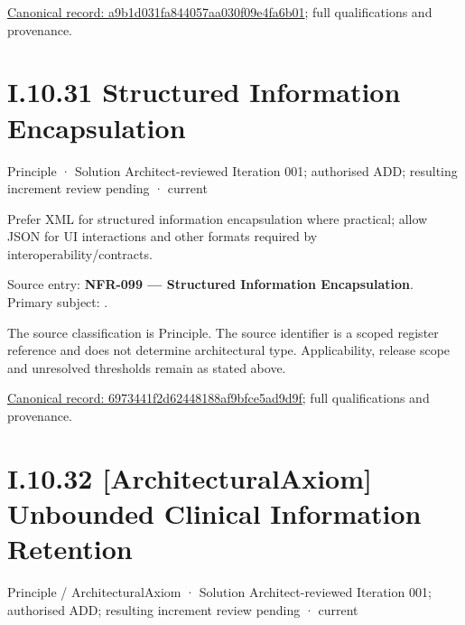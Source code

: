{\footnotesize \href{../../../../../../../continuum/motivation/principle/architectural-axiom/a9b1d031fa844057aa030f09e4fa6b01.md}{Canonical record: a9b1d031fa844057aa030f09e4fa6b01}; full qualifications and provenance.}\par
\section*{I.10.31 Structured Information Encapsulation}
\label{navigation:I.10.31}

\label{element:6973441f2d62448188af9bfce5ad9d9f}
{\small Principle · Solution Architect-reviewed Iteration 001; authorised ADD; resulting increment review pending · current}\par

Prefer XML for structured information encapsulation where practical; allow JSON for UI interactions and other formats required by interoperability/contracts.



Source entry: \textbf{NFR-099 — Structured Information Encapsulation}. Primary subject: \texttt{}.



The source classification is Principle. The source identifier is a scoped register reference and does not determine architectural type. Applicability, release scope and unresolved thresholds remain as stated above.


{\footnotesize \href{../../../../../../../continuum/motivation/principle/6973441f2d62448188af9bfce5ad9d9f.md}{Canonical record: 6973441f2d62448188af9bfce5ad9d9f}; full qualifications and provenance.}\par
\section*{I.10.32 [ArchitecturalAxiom] Unbounded Clinical Information Retention}
\label{navigation:I.10.32}

\label{element:4c270732fecf4e79bb83c938861ce05b}
{\small Principle / ArchitecturalAxiom · Solution Architect-reviewed Iteration 001; authorised ADD; resulting increment review pending · current}\par

